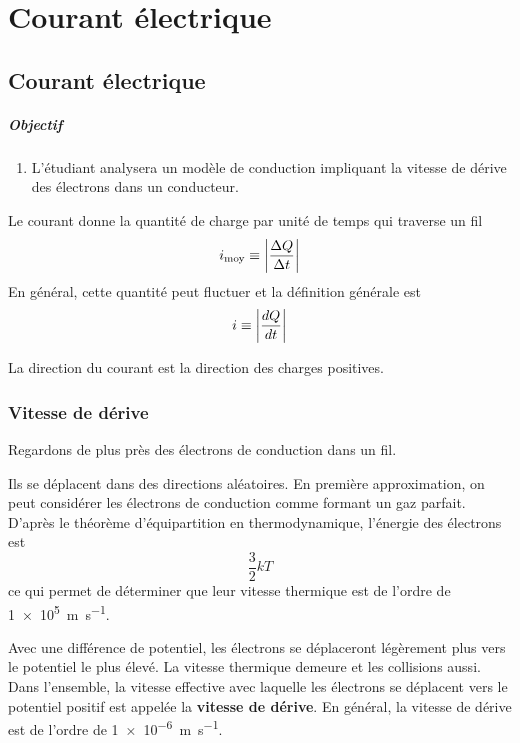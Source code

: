 \chapter{Courant électrique}

\section{Courant électrique}


\paragraph{Objectif}

\begin{enumerate}
  \item L'étudiant analysera un modèle de conduction impliquant la vitesse de
    dérive des électrons dans un conducteur.
\end{enumerate}


Le courant donne la quantité de charge par unité de temps qui traverse un fil
$$i_\mathrm{moy} \equiv \left| \frac{\Delta Q}{\Delta t} \right|$$
En général, cette quantité peut fluctuer et la définition générale est
$$i \equiv \left| \frac{dQ}{dt} \right|$$

La direction du courant est la direction des charges positives.


\subsection{Vitesse de dérive}

Regardons de plus près des électrons de conduction dans un fil.

Ils se déplacent dans des directions aléatoires. En première approximation, on
peut considérer les électrons de conduction comme formant un gaz parfait.
D'après le théorème d'équipartition en thermodynamique, l'énergie des électrons
est
$$\frac{3}{2} kT$$
ce qui permet de déterminer que leur vitesse thermique est de l'ordre de
\SI{1e5}{m\per s}.

Avec une différence de potentiel, les électrons se déplaceront légèrement plus
vers le potentiel le plus élevé. La vitesse thermique demeure et les collisions
aussi. Dans l'ensemble, la vitesse effective avec laquelle les électrons se
déplacent vers le potentiel positif est appelée la \textbf{vitesse de dérive}.
En général, la vitesse de dérive est de l'ordre de \SI{1e-6}{m\per s}.


